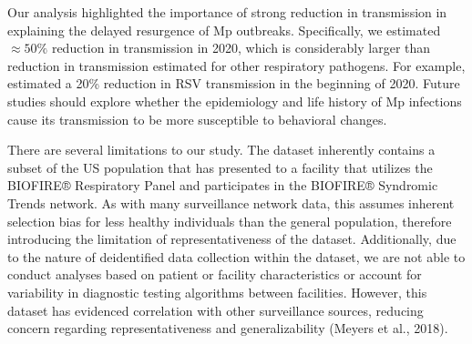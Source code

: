 \documentclass[12pt]{article}
\newcommand{\comment}[3]{\textcolor{#1}{\textbf{[#2: }\textsl{#3}\textbf{]}}}
\newcommand{\swp}[1]{\comment{magenta}{SWP}{#1}}
\begin{document}
Our analysis highlighted the importance of strong reduction in transmission in explaining the delayed resurgence of Mp outbreaks.
Specifically, we estimated $\approx 50\%$ reduction in transmission in 2020, which is considerably larger than reduction in transmission estimated for other respiratory pathogens.
For example, \cite{baker2020impact} estimated a 20\% reduction in RSV transmission in the beginning of 2020.
Future studies should explore whether the epidemiology and life history of Mp infections cause its transmission to be more susceptible to behavioral changes.



There are several limitations to our study.
The dataset inherently contains a subset of the US population that has presented to a facility that utilizes the BIOFIRE® Respiratory Panel and participates in the BIOFIRE® Syndromic Trends network. As with many surveillance network data, this assumes inherent selection bias for less healthy individuals than the general population, therefore introducing the limitation of representativeness of the dataset. Additionally, due to the nature of deidentified data collection within the dataset, we are not able to conduct analyses based on patient or facility characteristics or account for variability in diagnostic testing algorithms between facilities. However, this dataset has evidenced correlation with other surveillance sources, reducing concern regarding representativeness and generalizability (Meyers et al., 2018). 
\end{document}
